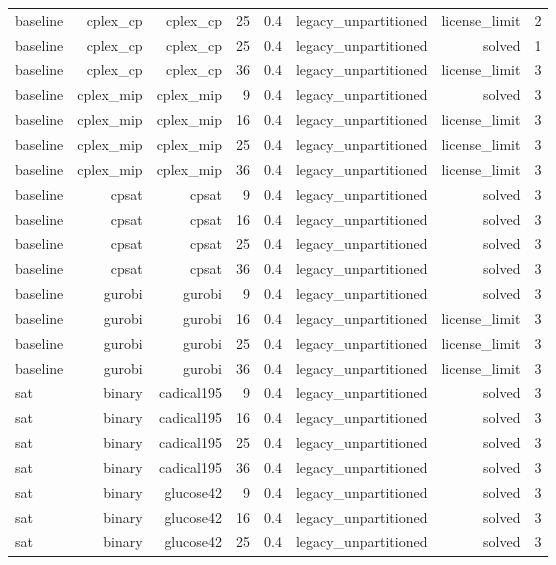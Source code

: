 \begin{tabular}{lrrrrrrr}
baseline & cplex\_cp & cplex\_cp & 25 & 0.4 & legacy\_unpartitioned & license\_limit & 2 \\
baseline & cplex\_cp & cplex\_cp & 25 & 0.4 & legacy\_unpartitioned & solved & 1 \\
baseline & cplex\_cp & cplex\_cp & 36 & 0.4 & legacy\_unpartitioned & license\_limit & 3 \\
baseline & cplex\_mip & cplex\_mip & 9 & 0.4 & legacy\_unpartitioned & solved & 3 \\
baseline & cplex\_mip & cplex\_mip & 16 & 0.4 & legacy\_unpartitioned & license\_limit & 3 \\
baseline & cplex\_mip & cplex\_mip & 25 & 0.4 & legacy\_unpartitioned & license\_limit & 3 \\
baseline & cplex\_mip & cplex\_mip & 36 & 0.4 & legacy\_unpartitioned & license\_limit & 3 \\
baseline & cpsat & cpsat & 9 & 0.4 & legacy\_unpartitioned & solved & 3 \\
baseline & cpsat & cpsat & 16 & 0.4 & legacy\_unpartitioned & solved & 3 \\
baseline & cpsat & cpsat & 25 & 0.4 & legacy\_unpartitioned & solved & 3 \\
baseline & cpsat & cpsat & 36 & 0.4 & legacy\_unpartitioned & solved & 3 \\
baseline & gurobi & gurobi & 9 & 0.4 & legacy\_unpartitioned & solved & 3 \\
baseline & gurobi & gurobi & 16 & 0.4 & legacy\_unpartitioned & license\_limit & 3 \\
baseline & gurobi & gurobi & 25 & 0.4 & legacy\_unpartitioned & license\_limit & 3 \\
baseline & gurobi & gurobi & 36 & 0.4 & legacy\_unpartitioned & license\_limit & 3 \\
sat & binary & cadical195 & 9 & 0.4 & legacy\_unpartitioned & solved & 3 \\
sat & binary & cadical195 & 16 & 0.4 & legacy\_unpartitioned & solved & 3 \\
sat & binary & cadical195 & 25 & 0.4 & legacy\_unpartitioned & solved & 3 \\
sat & binary & cadical195 & 36 & 0.4 & legacy\_unpartitioned & solved & 3 \\
sat & binary & glucose42 & 9 & 0.4 & legacy\_unpartitioned & solved & 3 \\
sat & binary & glucose42 & 16 & 0.4 & legacy\_unpartitioned & solved & 3 \\
sat & binary & glucose42 & 25 & 0.4 & legacy\_unpartitioned & solved & 3 \\

\end{tabular}
